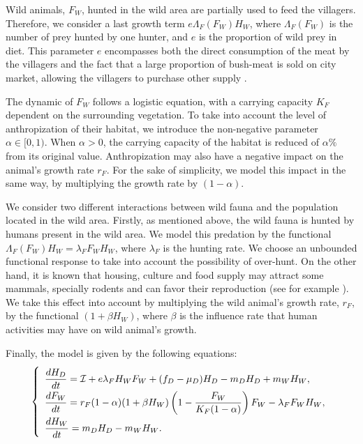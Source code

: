 \documentclass{article}
\newcommand{\lfw}{\lambda_{F}}
\newcommand{\lfw}{\lambda_{F}}
\newcommand{\cI}{\mathcal{I}}
\theoremstyle{definition}
\theoremstyle{remark}
\begin{document}
Wild animals, $F_W$, hunted in the wild area are partially used to feed the villagers. Therefore, we consider a last growth term $e \Lambda_F(F_W) H_W$, where $\Lambda_F(F_W)$ is the number of prey hunted by one hunter, and $e$ is the proportion of wild prey in diet. This parameter $e$ encompasses both the direct consumption of the meat by the villagers and the fact that a large proportion of bush-meat is sold on city market, allowing the villagers to purchase other supply \cite{wilkie_bushmeat_1998}.


The dynamic of $F_W$ follows a logistic equation, with a carrying capacity $K_F$ dependent on the surrounding vegetation. To take into account the level of anthropization of their habitat, we introduce the non-negative parameter $\alpha \in [0, 1)$. When $\alpha > 0$, the carrying capacity of the habitat is reduced of $\alpha \%$ from its original value. Anthropization may also have a negative impact on the animal's growth rate $r_F$. For the sake of simplicity, we model this impact in the same way, by multiplying the growth rate by $(1-\alpha)$.

We consider two different interactions between wild fauna and the population located in the wild area. Firstly, as mentioned above, the wild fauna is hunted by humans present in the wild area. We model this predation by the functional $\Lambda_F(F_W)H_W =  \lfw F_W H_W$, where $\lfw$ is the hunting rate. We choose an unbounded functional response to take into account the possibility of over-hunt. On the other hand, it is known that housing, culture and food supply may attract some mammals, specially rodents and can favor their reproduction (see for example \cite{dobigny_zoonotic_2022, dounias_foraging_2011}). We take this effect into account by multiplying the wild animal's growth rate, $r_F$, by the functional $(1 +  \beta H_W)$, where $\beta$ is the influence rate that human activities may have on wild animal's growth.

\medskip
Finally, the model is given by the following equations:
\begin{equation}
\def\arraystretch{2}
\left\{ 
\begin{array}{l}
\dfrac{dH_D}{dt}= \cI + e\lfw H_W F_W + (f_D - \mu_D) H_D - m_D H_D + m_W H_W, \\
\dfrac{dF_W}{dt} = r_F(1- \alpha) (1+ \beta H_W) \left(1 - \dfrac{F_W}{K_F(1-\alpha)} \right) F_W - \lfw F_W H_W,\\
\dfrac{dH_W}{dt}= m_D H_D - m_W H_W.
\end{array} \right.
\label{equation:HDFWHW}
\end{equation}
\end{document}
